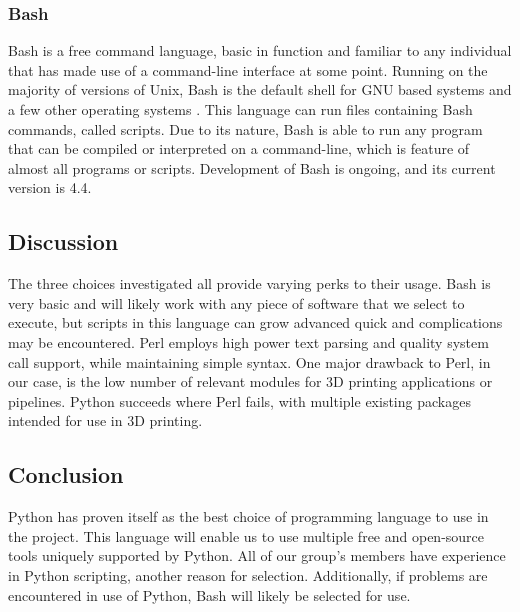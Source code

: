 \documentclass[letterpaper, onecolumn, draftclsnofoot, 10pt, compsoc]{IEEEtran}
\begin{document}
                \subsubsection{Bash}
                        \begin{singlespace}
                        Bash is a free command language, basic in function and familiar to any individual that has made use of a command-line interface at some point.
                        Running on the majority of versions of Unix, Bash is the default shell for GNU based systems and a few other operating systems \cite{bash}.
                        This language can run files containing Bash commands, called scripts.
                        Due to its nature, Bash is able to run any program that can be compiled or interpreted on a command-line, which is feature of almost all programs or scripts.
                        Development of Bash is ongoing, and its current version is 4.4.
                        \end{singlespace}
        \subsection{Discussion}
                \begin{singlespace}
                The three choices investigated all provide varying perks to their usage.
                Bash is very basic and will likely work with any piece of software that we select to execute, but scripts in this language can grow advanced quick and complications may be encountered.
                Perl employs high power text parsing and quality system call support, while maintaining simple syntax.
                One major drawback to Perl, in our case, is the low number of relevant modules for 3D printing applications or pipelines.
                Python succeeds where Perl fails, with multiple existing packages intended for use in 3D printing.
                \end{singlespace}
        \subsection{Conclusion}
                \begin{singlespace}
                Python has proven itself as the best choice of programming language to use in the project.
                This language will enable us to use multiple free and open-source tools uniquely supported by Python.
                All of our group's members have experience in Python scripting, another reason for selection.
                Additionally, if problems are encountered in use of Python, Bash will likely be selected for use.
                \end{singlespace}
\end{document}
